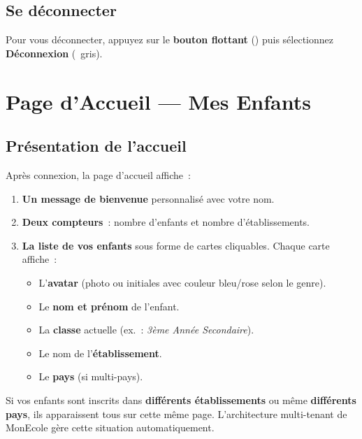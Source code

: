\documentclass[12pt,a4paper]{report}
\begin{document}
\section{Se d\'econnecter}

Pour vous d\'econnecter, appuyez sur le \textbf{bouton flottant} (\faTh) puis s\'electionnez \textbf{D\'econnexion} (\faSignOutAlt\ gris).

\newpage
\chapter{Page d'Accueil --- Mes Enfants}

\section{Pr\'esentation de l'accueil}

Apr\`es connexion, la page d'accueil affiche~:

\begin{enumerate}[leftmargin=1.2cm]
  \item \textbf{Un message de bienvenue} personnalis\'e avec votre nom.
  \item \textbf{Deux compteurs}~: nombre d'enfants et nombre d'\'etablissements.
  \item \textbf{La liste de vos enfants} sous forme de cartes cliquables. Chaque carte affiche~:
  \begin{itemize}
    \item L'\textbf{avatar} (photo ou initiales avec couleur bleu/rose selon le genre).
    \item Le \textbf{nom et pr\'enom} de l'enfant.
    \item La \textbf{classe} actuelle (ex.~: \textit{3\`eme Ann\'ee Secondaire}).
    \item Le nom de l'\textbf{\'etablissement}.
    \item Le \textbf{pays} (si multi-pays).
  \end{itemize}
\end{enumerate}

\begin{info}
Si vos enfants sont inscrits dans \textbf{diff\'erents \'etablissements} ou m\^eme \textbf{diff\'erents pays}, ils apparaissent tous sur cette m\^eme page. L'architecture multi-tenant de MonEcole g\`ere cette situation automatiquement.
\end{info}
\end{document}
